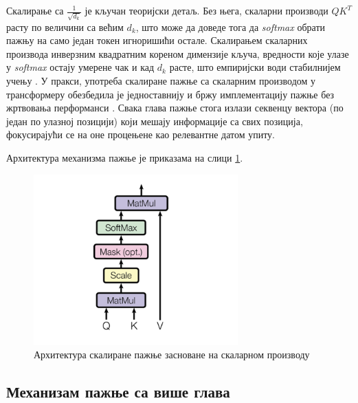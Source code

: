 \documentclass[a4paper, 12pt, master, utf8]{etf}
\begin{document}
Скалирање са $\frac{1}{\sqrt{d_k}}$ је кључан теоријски детаљ. Без њега, скаларни производи $QK^T$ расту по величини са већим $d_k$, што може да доведе тога да \textit{softmax} обрати пажњу на само један токен игноришићи остале. Скалирањем скаларних производа инверзним квадратним кореном димензије кључа, вредности које улазе у \textit{softmax} остају умерене чак и кад $d_k$ расте, што емпиријски води стабилнијем учењу \cite{vaswani_attention_2017,bahdanau_neural_2015}. У пракси, употреба скалиране пажње са скаларним производом у трансформеру обезбедила је једноставнију и бржу имплементацију пажње без жртвовања перформанси \cite{vaswani_attention_2017}. Свака глава пажње стога излази секвенцу вектора (по један по улазној позицији) који мешају информације са свих позиција, фокусирајући се на оне процењене као релевантне датом упиту.

Архитектура механизма пажње је приказама на слици \ref{fig:dot_attention}.

\begin{figure}[h]
    \centering
    \includegraphics[width=0.7\textwidth]{images/dot-attention.png}
    \caption{Архитектура скалиране пажње засноване на скаларном производу}
    \label{fig:dot_attention}
\end{figure}

\subsection{Механизам пажње са више глава}
\end{document}
